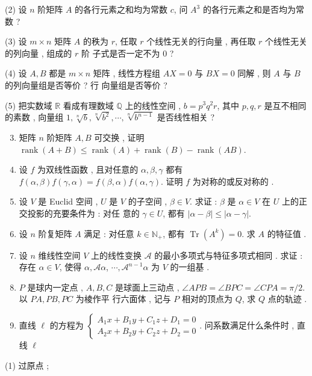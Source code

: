 \documentclass[10pt]{article}
\begin{document}
(2)  设  $n$  阶矩阵  $A$  的各行元素之和均为常数  $c$,  问  $A^{3}$  的各行元素之和是否均为常数 ?

(3)  设  $m \times n$  矩阵  $A$  的秩为  $r$,  任取  $r$  个线性无关的行向量 ,  再任取  $r$  个线性无关的列向量 ,  组成的  $r$  阶   子式是否一定不为  0 ?

(4)  设  $A, B$  都是  $m \times n$  矩阵 ,  线性方程组  $A X=0$  与  $B X=0$  同解 ,  则  $A$  与  $B$  的列向量组是否等价 ?  行   向量组是否等价 ?

(5)  把实数域  $\mathbb{R}$  看成有理数域  $\mathbb{Q}$  上的线性空间 , $b=p^{3} q^{2} r$,  其中  $p, q, r$  是互不相同的素数 ,  向量组  $1, \sqrt[n]{b}, \sqrt[n]{b^{2}}, \cdots, \sqrt[n]{b^{n-1}}$  是否线性相关 ?

\begin{enumerate}
  \setcounter{enumi}{2}
  \item  矩阵  $n$  阶矩阵  $A, B$  可交换 ,  证明  $\operatorname{rank}(A+B) \leqslant \operatorname{rank}(A)+\operatorname{rank}(B)-\operatorname{rank}(A B)$.

  \item  设  $f$  为双线性函数 ,  且对任意的  $\alpha, \beta, \gamma$  都有  $f(\alpha, \beta) f(\gamma, \alpha)=f(\beta, \alpha) f(\alpha, \gamma)$.  证明  $f$  为对称的或反对称的 .

  \item  设  $V$  是  Euclid  空间 , $U$  是  $V$  的子空间 , $\beta \in V$.  求证 : $\beta$  是  $\alpha \in V$  在  $U$  上的正交投影的充要条件为 :  对任   意的  $\gamma \in U$,  都有  $|\alpha-\beta| \leqslant|\alpha-\gamma|$.

  \item  设  $n$  阶复矩阵  $A$  满足 :  对任意  $k \in \mathbb{N}_{+}$,  都有  $\operatorname{Tr}\left(A^{k}\right)=0$.  求  $A$  的特征值 .

  \item  设  $n$  维线性空间  $V$  上的线性变换  $\mathscr{A}$  的最小多项式与特征多项式相同 .  求证 :  存在  $\alpha \in V$,  使得  $\alpha, \mathscr{A} \alpha$, $\cdots, \mathscr{A}^{n-1} \alpha$  为  $V$  的一组基 .

  \item $P$  是球内一定点 , $A, B, C$  是球面上三动点 , $\angle A P B=\angle B P C=\angle C P A=\pi / 2$.  以  $P A, P B, P C$  为棱作平   行六面体 ,  记与  $P$  相对的顶点为  $Q$,  求  $Q$  点的轨迹 .

  \item  直线  $\ell$  的方程为  $\left\{\begin{array}{l}A_{1} x+B_{1} y+C_{1} z+D_{1}=0 \\ A_{2} x+B_{2} y+C_{2} z+D_{2}=0\end{array}\right.$.  问系数满足什么条件时 ,  直线  $\ell$

\end{enumerate}
(1)  过原点 ;
\end{document}
